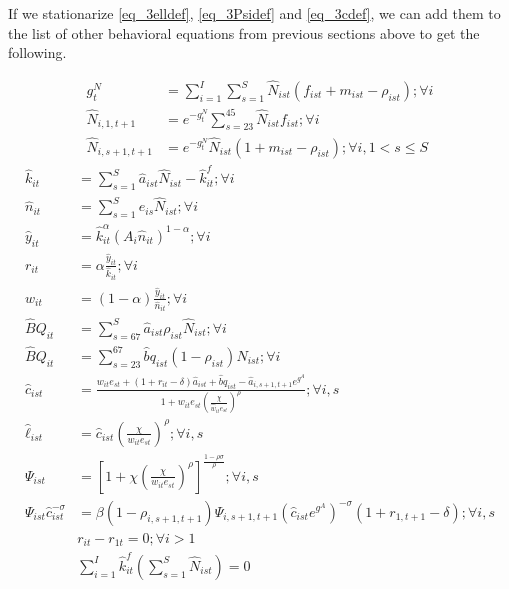 \documentclass[letterpaper,12pt]{article}
\theoremstyle{definition}
\numberwithin{equation}{section}
\begin{document}
\begin{spacing}{1.5}
	If we stationarize \eqref{eq_3elldef}, \eqref{eq_3Psidef} and \eqref{eq_3cdef}, we can add them to the list of other behavioral equations from previous sections above to get the following.

	\begin{align}
		g^N_t & = \sum_{i=1}^I \sum_{s=1}^S \hat N_{ist} (f_{ist}+m_{ist}-\rho_{ist}) ; \forall i \label{eq_3gNdef}\\
		\hat N_{i,1,t+1} & = e^{-g^N_t}\sum_{s=23}^{45} \hat N_{ist} f_{ist} ; \forall i\\
		\hat N_{i,s+1,t+1} & = e^{-g^N_t}\hat N_{ist} (1+m_{ist}-\rho_{ist}); \forall i, 1<s\le S \label{eq_3pop2}
	\end{align}
	\begin{align}
		\hat k_{it} & = \sum_{s=1}^S \hat a_{ist} \hat N_{ist} - \hat k_{it}^f; \forall i \\
		\hat n_{it} & = \sum_{s=1}^S e_{is} \hat N_{ist}; \forall i \\
		\hat y_{it} & = \hat k_{it}^\alpha \left( A_{i} \hat n_{it} \right)^{1-\alpha} ; \forall i \\
		r_{it} & = \alpha \frac{\hat y_{it}}{\hat k_{it}}; \forall i \\
		w_{it} & = (1-\alpha) \frac{\hat y_{it}}{\hat n_{it}}; \forall i \\
		\hat BQ_{it} & = \sum_{s=67}^S \hat a_{ist} \rho_{ist} \hat N_{ist} ; \forall i \\
		\hat BQ_{it} & = \sum_{s=23}^{67} \hat bq_{ist} (1-\rho_{ist}) \hat N_{ist}	; \forall i \\
    	\hat c_{ist} & = \frac{w_{it} e_{st} + (1+r_{it}-\delta)\hat a_{ist} + {\hat bq}_{ist} - \hat a_{i,s+1,t+1}e^{g^A}} {1 + w_{it} e_{st} \left(\frac{\chi} {\hat w_{it} e_{st}}\right)^{\rho}}; \forall i,s \\
		\hat \ell_{ist} & = \hat c_{ist} \left(\frac{\chi}{w_{it}e_{st}}\right)^\rho ; \forall i,s \\
		\Psi_{ist} & = \left[1 + \chi \left(\frac{\chi} {w_{it} e_{st}}\right)^{\rho} \right]^{\frac{1-\rho \sigma}{\rho}}; \forall i,s \\
		\Psi_{ist} \hat c_{ist}^{-\sigma} & = \beta (1-\rho_{i,s+1,t+1}) \Psi_{i,s+1,t+1} \left(\hat c_{ist}e^{g^A}\right)^{-\sigma}(1+r_{1,t+1}-\delta); \forall i,s \\
		& r_{it} - r_{1t} = 0; \forall i>1 \\
		& \sum_{i=1}^I \hat k^f_{it} \left( \sum_{s=1}^S \hat N_{ist} \right) = 0
	\end{align}


\end{spacing}
\end{document}
